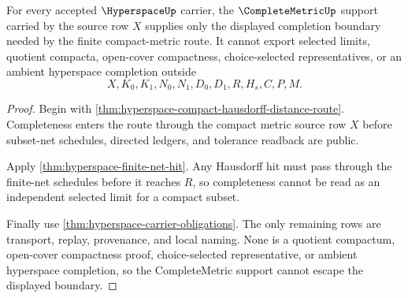 \begin{theorem}
\label{thm:hyperspace-complete-metric-nonescape}
For every accepted $\HyperspaceUp$ carrier, the $\CompleteMetricUp$ support carried by the source row $X$ supplies only the displayed completion boundary needed by the finite compact-metric route. It cannot export selected limits, quotient compacta, open-cover compactness, choice-selected representatives, or an ambient hyperspace completion outside
$$
X,K_0,K_1,N_0,N_1,D_0,D_1,R,H_s,C,P,M .
$$
\end{theorem}
\begin{proof}
Begin with \autoref{thm:hyperspace-compact-hausdorff-distance-route}. Completeness enters the route through the compact metric source row $X$ before subset-net schedules, directed ledgers, and tolerance readback are public.

Apply \autoref{thm:hyperspace-finite-net-hit}. Any Hausdorff hit must pass through the finite-net schedules before it reaches $R$, so completeness cannot be read as an independent selected limit for a compact subset.

Finally use \autoref{thm:hyperspace-carrier-obligations}. The only remaining rows are transport, replay, provenance, and local naming. None is a quotient compactum, open-cover compactness proof, choice-selected representative, or ambient hyperspace completion, so the CompleteMetric support cannot escape the displayed boundary.
\end{proof}

